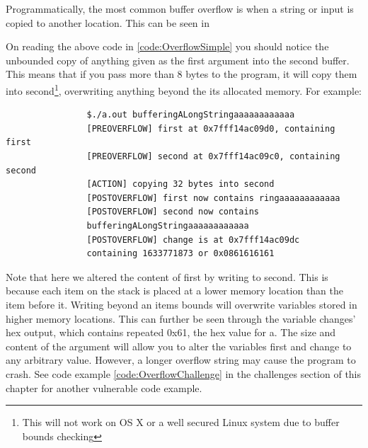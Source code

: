 \documentclass[a4paper,11pt]{report}
\begin{document}
		Programmatically, the most common buffer overflow is when a string or input is copied to another location. This can be seen in %
		\begin{code}
			C}]{./OverflowSimple.c}
			\caption{Simple Buffer Overflow Example}
			\label{code:OverflowSimple}
		\end{code}
			On reading the above code in \ref{code:OverflowSimple} you should notice the unbounded copy of anything given as the first argument into the second buffer. 
			This means that if you pass more than 8 bytes to the program, it will copy them into second\footnote{This will not work on OS X or a well secured Linux system due to buffer bounds checking}, overwriting anything beyond the its allocated memory. 
			For example:
			\begin{verbatim}
				$./a.out bufferingALongStringaaaaaaaaaaaa
				[PREOVERFLOW] first at 0x7fff14ac09d0, containing first
				[PREOVERFLOW] second at 0x7fff14ac09c0, containing second
				[ACTION] copying 32 bytes into second
				[POSTOVERFLOW] first now contains ringaaaaaaaaaaaa
				[POSTOVERFLOW] second now contains 
				bufferingALongStringaaaaaaaaaaaa
				[POSTOVERFLOW] change is at 0x7fff14ac09dc 
				containing 1633771873 or 0x0861616161
			\end{verbatim}
			Note that here we altered the content of first by writing to second. 
			This is because each item on the stack is placed at a lower memory location than the item before it. 
			Writing beyond an items bounds will overwrite variables stored in higher memory locations. 
			This can further be seen through the variable changes' hex output, which contains repeated 0x61, the hex value for a. 
			The size and content of the argument will allow you to alter the variables first and change to any arbitrary value.
			However, a longer overflow string may cause the program to crash. 
			See code example \ref{code:OverflowChallenge} in the challenges section of this chapter for another vulnerable code example. 
\end{document}
